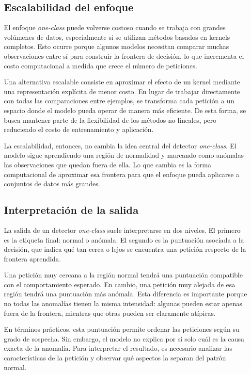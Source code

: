 \documentclass[12pt,oneside]{report}
\begin{document}
\subsection{Escalabilidad del enfoque}

El enfoque \textit{one-class} puede volverse costoso cuando se trabaja con grandes volúmenes de datos, especialmente si se utilizan métodos basados en kernels completos. Esto ocurre porque algunos modelos necesitan comparar muchas observaciones entre sí para construir la frontera de decisión, lo que incrementa el costo computacional a medida que crece el número de peticiones.

Una alternativa escalable consiste en aproximar el efecto de un kernel mediante una representación explícita de menor costo. En lugar de trabajar directamente con todas las comparaciones entre ejemplos, se transforma cada petición a un espacio donde el modelo pueda operar de manera más eficiente. De esta forma, se busca mantener parte de la flexibilidad de los métodos no lineales, pero reduciendo el costo de entrenamiento y aplicación.

La escalabilidad, entonces, no cambia la idea central del detector \textit{one-class}. El modelo sigue aprendiendo una región de normalidad y marcando como anómalas las observaciones que quedan fuera de ella. Lo que cambia es la forma computacional de aproximar esa frontera para que el enfoque pueda aplicarse a conjuntos de datos más grandes.

\subsection{Interpretación de la salida}

La salida de un detector \textit{one-class} suele interpretarse en dos niveles. El primero es la etiqueta final: normal o anómala. El segundo es la puntuación asociada a la decisión, que indica qué tan cerca o lejos se encuentra una petición respecto de la frontera aprendida.

Una petición muy cercana a la región normal tendrá una puntuación compatible con el comportamiento esperado. En cambio, una petición muy alejada de esa región tendrá una puntuación más anómala. Esta diferencia es importante porque no todas las anomalías tienen la misma intensidad: algunas pueden estar apenas fuera de la frontera, mientras que otras pueden ser claramente atípicas.

En términos prácticos, esta puntuación permite ordenar las peticiones según su grado de sospecha. Sin embargo, el modelo no explica por sí solo cuál es la causa exacta de la anomalía. Para interpretar el resultado, es necesario analizar las características de la petición y observar qué aspectos la separan del patrón normal.
\end{document}
